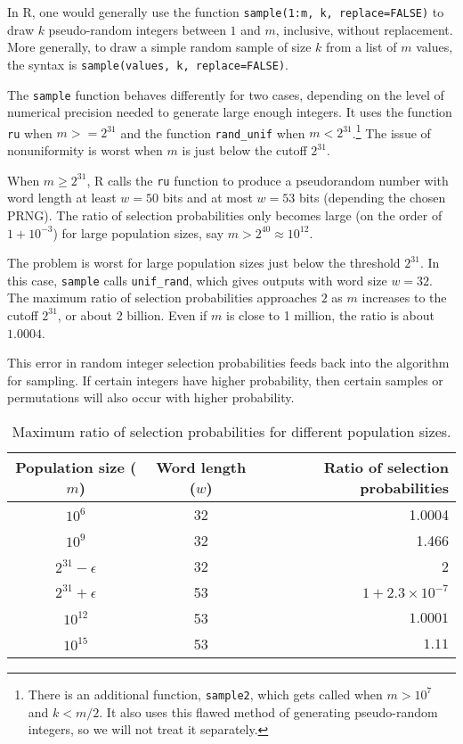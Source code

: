 \documentclass[12pt]{article}
\begin{document}

In R, one would generally use the function \texttt{sample(1:m, k, replace=FALSE)} to draw $k$ pseudo-random integers between $1$ and $m$, inclusive, without replacement. 
More generally, to draw a simple random sample of size $k$ from a list of $m$ values, the syntax is \texttt{sample(values, k, replace=FALSE)}.

The \texttt{sample} function behaves differently for two cases, depending on the level of numerical
precision needed to generate large enough integers. 
It uses the function \texttt{ru} when $m >= 2^{31}$ and the function \texttt{rand\_unif} when $m < 2^{31}$.\footnote{
There is an additional function, \texttt{sample2}, which gets called when $m > 10^7$ and $k < m/2$.
It also uses this flawed method of generating pseudo-random integers, so we will not treat it separately.
}
The issue of nonuniformity is worst when $m$ is just below the cutoff $2^{31}$. 

When $m \ge 2^{31}$, R calls the \texttt{ru} function to produce a pseudorandom number with word length at least $w=50$ bits and at most $w=53$ bits (depending the chosen PRNG). 
The ratio of selection probabilities only becomes large (on the order of $1+10^{-3}$) for large population sizes, say $m > 2^{40} \approx 10^{12}$. 

The problem is worst for large population sizes just below the threshold $2^{31}$.
 In this case, \texttt{sample} calls \texttt{unif\_rand}, which gives outputs with word size $w=32$. 
 The maximum ratio of selection probabilities approaches $2$ as $m$ increases to the cutoff $2^{31}$, or about 2 billion. 
 Even if $m$ is close to 1 million, the ratio is about $1.0004$.

This error in random integer selection probabilities feeds back into the algorithm for sampling. 
If certain integers have higher probability, then certain samples or permutations will also occur with higher probability.


\begin{table}[h]
\caption{Maximum ratio of selection probabilities for different population sizes.}
\begin{center}
\begin{tabular}{|c|c|r|}


Population size ($m$) & Word length ($w$) & Ratio of selection probabilities\\
\hline 
$10^6$ & 32 & 1.0004 \\
$10^9$ & 32 & 1.466 \\
 $2^{31}-\epsilon$ & 32 & 2 \\
$2^{31}+\epsilon$ & 53 & $1 + 2.3 \times 10^{-7}$ \\
$10^{12}$ & 53 & $1.0001$ \\
$10^{15}$ & 53 & $1.11$ \\

\end{tabular}
\end{center}
\label{tab}
\end{table}%




\end{document}
